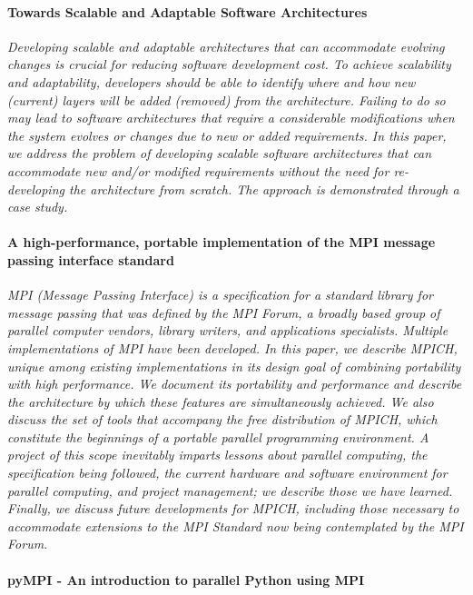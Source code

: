 \documentclass{article}
\begin{document}
\paragraph{Towards Scalable and Adaptable Software Architectures} \cite{fayad2005towards}

\emph{Developing scalable and adaptable architectures that can accommodate
evolving changes is crucial for reducing software development cost. To achieve
scalability and adaptability, developers should be able to identify where and
how new (current) layers will be added (removed) from the architecture.
Failing to do so may lead to software architectures that require a considerable
modifications when the system evolves or changes due to new or added
requirements. In this paper, we address the problem of developing scalable
software architectures that can accommodate new and/or modified requirements
without the need for re-developing the architecture from scratch. The approach
is demonstrated through a case study.}

\paragraph{A high-performance, portable implementation of the MPI message passing
interface standard} \cite{gropp1996high}

\emph{MPI (Message Passing Interface) is a specification for a standard library
for message passing that was defined by the MPI Forum, a broadly based group of
parallel computer vendors, library writers, and applications specialists.
Multiple implementations of MPI have been developed. In this paper, we describe
MPICH, unique among existing implementations in its design goal of combining
portability with high performance. We document its portability and performance
and describe the architecture by which these features are simultaneously
achieved. We also discuss the set of tools that accompany the free distribution
of MPICH, which constitute the beginnings of a portable parallel programming
environment. A project of this scope inevitably imparts lessons about parallel
computing, the specification being followed, the current hardware and software
environment for parallel computing, and project management; we describe those
we have learned.  Finally, we discuss future developments for MPICH, including
those necessary to accommodate extensions to the MPI Standard now being
contemplated by the MPI Forum.}

\paragraph{pyMPI - An introduction to parallel Python using MPI}
\cite{miller2002pympi}
\end{document}
